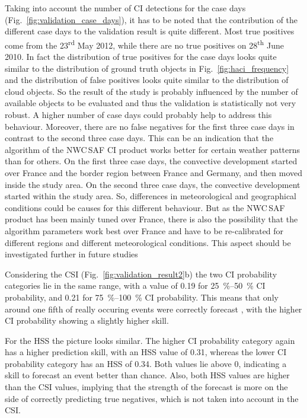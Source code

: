 Taking into account the number of CI detections for the case days (Fig.~\ref{fig:validation_case_days}), it has to be noted that the contribution of the different case days to the validation result is quite different. Most true positives come from the 23\textsuperscript{rd} May 2012, while there are no true positives on 28\textsuperscript{th} June 2010. In fact the distribution of true positives for the case days looks quite similar to the distribution of ground truth objects in Fig.~\ref{fig:haci_frequency} and the distribution of false positives looks quite similar to the distribution of cloud objects. So the result of the study is probably influenced by the number of available objects to be evaluated and thus the validation  is statistically not very robust. A higher number of case days could probably help to address this behaviour. Moreover, there are no false negatives for the first three case days in contrast to the second three case days. This can be an indication that the algorithm of the NWC\,SAF CI product works better for certain weather patterns than for others. On the first three case days, the convective development started over France and the border region between France and Germany, and then moved inside the study area. On the second three case days, the convective development started within the study area. So, differences in meteorological and geographical conditions could be causes for this different behaviour. But as the NWC\,SAF product has been mainly tuned over France, there is also the possibility that the algorithm parameters work best over France and have to be re-calibrated for different regions and different meteorological conditions. This aspect should be investigated further in future studies

Considering the CSI (Fig.~\ref{fig:validation_result2}b) the two CI probability categories {lie} in the same range, with a value of \num{0.19} for \SIrange{25}{50}{\percent} CI probability, and \num{0.21} for \SIrange{75}{100}{\percent} CI probability. This means that only around one fifth of really occuring events were correctly forecast , with the higher CI probability showing a slightly higher skill. 

For the HSS the picture looks similar. The higher CI probability category again has a higher prediction skill, with an HSS value of \num{0.31}, whereas the lower CI probability category has an HSS of \num{0.34}.  Both values lie above 0, indicating a skill to forecast an event better than chance. Also, both HSS values are higher than the CSI values, implying that the strength of the forecast is more on the side of correctly predicting true negatives, which is not taken into account in the CSI.


